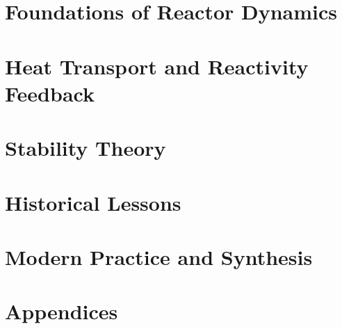 \documentclass[11pt,oneside]{report}
\theoremstyle{plain}
\theoremstyle{definition}
\theoremstyle{remark}
\begin{document}
\part{Foundations of Reactor Dynamics}





\part{Heat Transport and Reactivity Feedback}




\part{Stability Theory}






\part{Historical Lessons}






\part{Modern Practice and Synthesis}




\appendix
\part*{Appendices}








\end{document}
